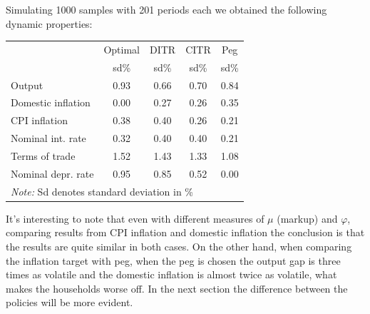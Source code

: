 \documentclass{article}
\begin{document}
\begin{minipage}{0.50\textwidth}
    Simulating 1000 samples with 201 periods each we obtained the following dynamic properties:
    \begin{table}[H]
        \centering
        \begin{tabular}{lcccc}
            \hline
            & Optimal & DITR & CITR & Peg\\
            & sd\% & sd\% & sd\% & sd\% \\
            \hline
            Output & 0.93 & 0.66 & 0.70 & 0.84 \\
            Domestic inflation & 0.00 & 0.27 & 0.26 & 0.35 \\
            CPI inflation & 0.38 & 0.40 & 0.26 & 0.21 \\
            Nominal int. rate & 0.32 & 0.40 & 0.40 & 0.21 \\
            Terms of trade & 1.52 & 1.43 & 1.33 & 1.08 \\
            Nominal depr. rate & 0.95 & 0.85 & 0.52 & 0.00 \\
            \hline
            \multicolumn{5}{l}{\textit{Note: } Sd denotes standard deviation in \%}
        \end{tabular}
    \end{table}
    It's interesting to note that even with different measures of $\mu$ (markup) and $\varphi$, comparing results from CPI inflation and domestic inflation the conclusion is that the results are quite similar in both cases. On the other hand, when comparing the inflation target with peg, when the peg is chosen the output gap is three times as volatile and the domestic inflation is almost twice as volatile, what makes the households worse off. In the next section the difference between the policies will be more evident.
\end{minipage}
\begin{minipage}{0.02\textwidth}
\end{minipage}
\end{document}
